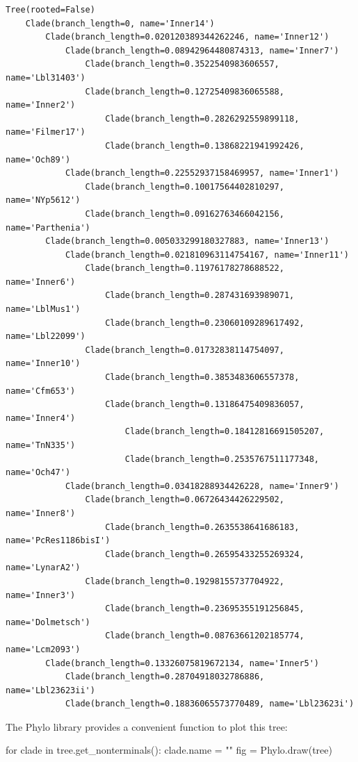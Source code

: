 \documentclass[
  a4paperpaper,
  ,captions=tableheading
]{scrbook}
\newenvironment{Shaded}{\begin{snugshade}}{\end{snugshade}}
\newcommand{\ControlFlowTok}[1]{\textcolor[rgb]{0.00,0.23,0.31}{#1}}
\newcommand{\KeywordTok}[1]{\textcolor[rgb]{0.00,0.23,0.31}{#1}}
\newcommand{\NormalTok}[1]{\textcolor[rgb]{0.00,0.23,0.31}{#1}}
\newcommand{\OperatorTok}[1]{\textcolor[rgb]{0.37,0.37,0.37}{#1}}
\newcommand{\StringTok}[1]{\textcolor[rgb]{0.13,0.47,0.30}{#1}}
\begin{document}
\begin{verbatim}
Tree(rooted=False)
    Clade(branch_length=0, name='Inner14')
        Clade(branch_length=0.020120389344262246, name='Inner12')
            Clade(branch_length=0.08942964480874313, name='Inner7')
                Clade(branch_length=0.3522540983606557, name='Lbl31403')
                Clade(branch_length=0.12725409836065588, name='Inner2')
                    Clade(branch_length=0.2826292559899118, name='Filmer17')
                    Clade(branch_length=0.13868221941992426, name='Och89')
            Clade(branch_length=0.22552937158469957, name='Inner1')
                Clade(branch_length=0.10017564402810297, name='NYp5612')
                Clade(branch_length=0.09162763466042156, name='Parthenia')
        Clade(branch_length=0.005033299180327883, name='Inner13')
            Clade(branch_length=0.021810963114754167, name='Inner11')
                Clade(branch_length=0.11976178278688522, name='Inner6')
                    Clade(branch_length=0.287431693989071, name='LblMus1')
                    Clade(branch_length=0.23060109289617492, name='Lbl22099')
                Clade(branch_length=0.01732838114754097, name='Inner10')
                    Clade(branch_length=0.3853483606557378, name='Cfm653')
                    Clade(branch_length=0.13186475409836057, name='Inner4')
                        Clade(branch_length=0.18412816691505207, name='TnN335')
                        Clade(branch_length=0.2535767511177348, name='Och47')
            Clade(branch_length=0.03418288934426228, name='Inner9')
                Clade(branch_length=0.06726434426229502, name='Inner8')
                    Clade(branch_length=0.2635538641686183, name='PcRes1186bisI')
                    Clade(branch_length=0.26595433255269324, name='LynarA2')
                Clade(branch_length=0.19298155737704922, name='Inner3')
                    Clade(branch_length=0.23695355191256845, name='Dolmetsch')
                    Clade(branch_length=0.08763661202185774, name='Lcm2093')
        Clade(branch_length=0.13326075819672134, name='Inner5')
            Clade(branch_length=0.28704918032786886, name='Lbl23623ii')
            Clade(branch_length=0.18836065573770489, name='Lbl23623i')
\end{verbatim}

The Phylo library provides a convenient function to plot this tree:

\begin{Shaded}
\begin{Highlighting}[]
\ControlFlowTok{for}\NormalTok{ clade }\KeywordTok{in}\NormalTok{ tree.get\_nonterminals():}
\NormalTok{    clade.name }\OperatorTok{=} \StringTok{""}
\NormalTok{fig }\OperatorTok{=}\NormalTok{ Phylo.draw(tree)}
\end{Highlighting}
\end{Shaded}
\end{document}
